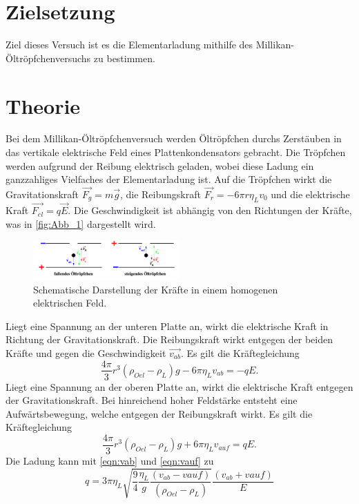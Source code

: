 \section{Zielsetzung}
\label{sec:Zielsetzung}
Ziel dieses Versuch ist es die Elementarladung mithilfe des Millikan-Öltröpfchenversuchs zu bestimmen.
\section{Theorie}
\label{sec:Theorie}
Bei dem Millikan-Öltröpfchenversuch werden Öltröpfchen durchs Zerstäuben in das vertikale
elektrische Feld eines Plattenkondensators gebracht. Die Tröpfchen werden aufgrund der Reibung
elektrisch geladen, wobei diese Ladung ein ganzzahliges Vielfaches der Elementarladung ist.
Auf die Tröpfchen wirkt die Gravitationskraft $\vec{F_g}=m \vec{g}$, die Reibungskraft 
$\vec{F_r} = - 6 \pi r \eta_L v_0$ und die elektrische Kraft $\vec{F_{el}} = q \vec{E}$.
Die Geschwindigkeit ist abhängig von den Richtungen der Kräfte, was in \autoref{fig:Abb_1} dargestellt wird.
\begin{figure}[H]
    \centering
    \includegraphics[width=0.5\textwidth]{Abbildungen/Abb_1.pdf}
    \caption {Schematische Darstellung der Kräfte in einem homogenen elektrischen Feld\cite[1]{V503}.}
    \label{fig:Abb_1}
\end{figure}
Liegt eine Spannung an der unteren Platte an, wirkt die elektrische Kraft in Richtung der Gravitationskraft.
Die Reibungskraft wirkt entgegen der beiden Kräfte und gegen die Geschwindigkeit $\vec{v_{ab}}$.
Es gilt die Kräftegleichung
\begin{equation}
    \frac{4 \pi}{3} r^3 (\rho_{Oel}-\rho_L)g - 6 \pi \eta_L v_{ab} = - q E.
    \label{eqn:vab}
\end{equation}
Liegt eine Spannung an der oberen Platte an, wirkt die elektrische Kraft entgegen der Gravitationskraft.
Bei hinreichend hoher Feldstärke entsteht eine Aufwärtsbewegung, welche entgegen der Reibungskraft wirkt.
Es gilt die Kräftegleichung
\begin{equation}
    \frac{4\pi}{3} r^3 (\rho_{Oel}-\rho_L) g + 6 \pi \eta_L v_{auf} = q E.
    \label{eqn:vauf}
\end{equation}
Die Ladung kann mit \autoref{eqn:vab} und \autoref{eqn:vauf} zu
\begin{equation}
   q = 3 \pi \eta_L \sqrt{\frac{9}{4} \frac{\eta_L}{g} \frac{(v_{ab}-v{auf})}{(\rho_{Oel}-\rho_L)}} \frac{(v_{ab}+v{auf})}{E}
    \label{eqn:Ladung}
\end{equation}
